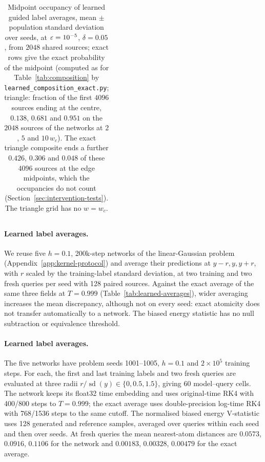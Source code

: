 \documentclass{article} %
\newif\ificlr
\theoremstyle{plain}
\theoremstyle{definition}
\theoremstyle{remark}
\begin{document}
\begin{table}[htb]
{\begin{tabular}{@{}llrrrrrr@{}}
\bottomrule
\end{tabular}}
\ificlr\resizebox{\textwidth}{!}{\lctable}\else\lctable\fi
\caption{Midpoint occupancy of learned guided label averages, mean $\pm$ population standard
deviation over seeds, at $\varepsilon=10^{-5}$, $\delta=0.05$, from $2048$ shared sources; exact
rows give the exact probability of the midpoint (computed as for Table~\ref{tab:composition} by
\texttt{learned\_composition\_exact.py}; triangle: fraction
of the first $4096$ sources ending at the centre, $0.138$, $0.681$ and $0.951$ on the $2048$
sources of the networks at $2$, $5$ and $10\,w_c$). The exact triangle composite ends a further
$0.426$, $0.306$ and $0.048$ of these $4096$ sources at the edge midpoints, which the occupancies
do not count (Section~\ref{sec:intervention-tests}). The triangle grid has no $w=w_c$.}
\label{tab:learned-composition}
\end{table}

\FloatBarrier
\paragraph{Learned label averages.} We reuse five $h=0.1$, 200k-step networks of the linear-Gaussian problem (Appendix~\ref{app:kernel-protocol}) and average
their predictions at $y-r,y,y+r$, with $r$ scaled by the training-label standard deviation, at
two training and two fresh queries per seed with 128 paired sources. Against the exact average of
the same three fields at $T=0.999$ (Table~\ref{tab:learned-averages}), wider averaging increases
the mean discrepancy, although not on every seed: exact atomicity does not transfer automatically
to a network. The biased energy statistic has no null subtraction or equivalence threshold.

\paragraph{Learned label averages.} The five networks have problem seeds 1001--1005, $h=0.1$ and
$2\times10^5$ training steps. For each, the first and last training labels and two fresh queries
are evaluated at three radii $r/\operatorname{sd}(y)\in\{0,0.5,1.5\}$, giving 60 model--query cells.
The network keeps its float32 time embedding and uses original-time RK4 with 400/800 steps to
$T=0.999$; the exact average uses double-precision log-time RK4 with 768/1536 steps to the same
cutoff. The normalised biased energy V-statistic uses 128 generated and reference samples,
averaged over queries within each seed and then over seeds. At fresh queries the mean
nearest-atom distances are $0.0573$, $0.0916$, $0.1106$ for the network and $0.00183$,
$0.00328$, $0.00479$ for the exact average.
\end{document}
